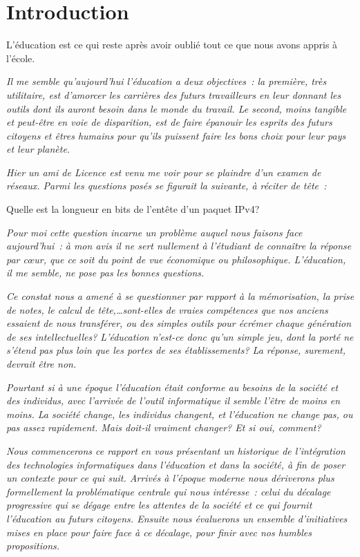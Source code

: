 
\chapter*{Introduction}\label{intro}

\begin{coolquote}
\Large L'éducation est ce qui reste après avoir oublié tout ce que nous avons appris à l'école. 
\end{coolquote}

\textit{Il me semble qu'aujourd'hui l'éducation a deux objectives~: la première, très utilitaire, est d’amorcer les carrières des futurs travailleurs en leur donnant les outils dont ils auront besoin dans le monde du travail. Le second, moins tangible et peut-être en voie de disparition, est de faire épanouir les esprits des futurs citoyens et êtres humains pour qu'ils puissent faire les bons choix pour leur pays et leur planète.}

\textit{Hier un ami de Licence est venu me voir pour se plaindre d'un examen de réseaux. Parmi les questions posés se figurait la suivante, à réciter de tête~:}

\begin{coolquote}\Large Quelle est la longueur en bits de l'entête d'un paquet IPv4?\end{coolquote}

\textit{Pour moi cette question incarne un problème auquel nous faisons face aujourd'hui~: à mon avis il ne sert nullement à l'étudiant de connaître la réponse par c\oe{}ur, que ce soit du point de vue économique ou philosophique. L'éducation, il me semble, ne pose pas les bonnes questions.}

\textit{Ce constat nous a amené à se questionner par rapport à la mémorisation, la prise de notes, le calcul de tête,\ldots sont-elles de vraies compétences que nos anciens essaient de nous transférer, ou des simples outils pour écrémer chaque génération de ses intellectuelles? L'éducation n'est-ce donc qu'un simple jeu, dont la porté ne s'étend pas plus loin que les portes de ses établissements? La réponse, surement, devrait être non.}

\textit{Pourtant si à une époque l'éducation était conforme au besoins de la société et des individus, avec l'arrivée de l'outil informatique il semble l'être de moins en moins. La société change, les individus changent, et l'éducation ne change pas, ou pas assez rapidement. Mais doit-il vraiment changer? Et si oui, comment?}

\textit{Nous commencerons ce rapport en vous présentant un historique de l'intégration des technologies informatiques dans l'éducation et dans la société, à fin de poser un contexte pour ce qui suit. Arrivés à l'époque moderne nous dériverons plus formellement la problématique centrale qui nous intéresse~: celui du décalage progressive qui se dégage entre les attentes de la société et ce qui fournit l'éducation au futurs citoyens. Ensuite nous évaluerons un ensemble d'initiatives mises en place pour faire face à ce décalage, pour finir avec nos humbles propositions.}